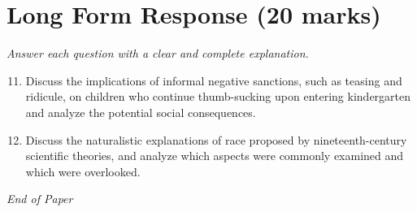 \documentclass[12pt]{article}
\begin{document}
\section*{Long Form Response (20 marks)}
\textit{Answer each question with a clear and complete explanation.}
\begin{enumerate}[label=\arabic*.]
\setcounter{enumi}{10}
\item Discuss the implications of informal negative sanctions, such as teasing and ridicule, on children who continue thumb-sucking upon entering kindergarten and analyze the potential social consequences.
\item Discuss the naturalistic explanations of race proposed by nineteenth-century scientific theories, and analyze which aspects were commonly examined and which were overlooked.
\end{enumerate}

\vfill
\noindent\textit{End of Paper}
\end{document}
